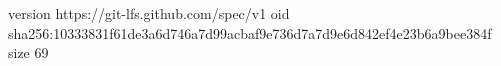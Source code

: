 version https://git-lfs.github.com/spec/v1
oid sha256:10333831f61de3a6d746a7d99acbaf9e736d7a7d9e6d842ef4e23b6a9bee384f
size 69
